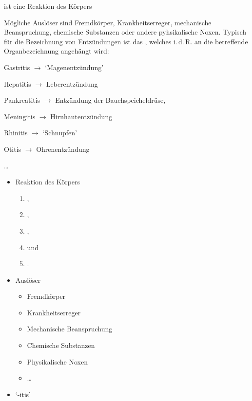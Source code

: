 \TextSlide
{ ist eine Reaktion des Körpers}
{%
%
\label{topic:entzuendung}%
Mögliche Auslöser sind Fremdkörper, Krankheitserreger,
mechanische Beanspruchung, chemische Substanzen oder andere
pyhsikalische Noxen.
Typisch für die Bezeichnung von Entzündungen ist das
,
welches i.\,d.\,R. an die betreffende Organbezeichnung angehängt
wird: 
\begin{compactitem}
  \item Gastritis ${\rightarrow}$ \enquote*{Magenentzündung}
  \item Hepatitis ${\rightarrow}$ Leberentzündung
  \item Pankreatitis ${\rightarrow}$ Entzündung der Bauchspeicheldrüse,
  \item Meningitis ${\rightarrow}$ Hirnhautentzündung
  \item Rhinitis ${\rightarrow}$ \enquote*{Schnupfen}
  \item Otitis ${\rightarrow}$ Ohrenentzündung
  \item \ldots
\end{compactitem}
}
{
\begin{itemize}
  \item Reaktion des Körpers
  \begin{enumerate}
    \item {},
    \item {},
    \item {},
    \item {} und
    \item {}.
  \end{enumerate}
  \item Auslöser
  \begin{itemize}
    \item Fremdkörper
    \item Krankheitserreger
    \item Mechanische Beanspruchung
    \item Chemische Substanzen
    \item Physikalische Noxen
    \item \ldots{}
  \end{itemize}
  \item {\enquote*{{-itis}}}
\end{itemize}


}
{}
{}
{}



